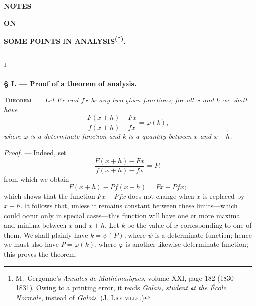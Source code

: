 
\providecommand{\GalSourcePageStart}[4]{}%
\providecommand{\GalSourcePageBoundary}[4]{\space}%
\providecommand{\GalSourceError}[2]{#1}%
\providecommand{\GalHistoricalFootnote}[1]{\footnote{#1}}%
\providecommand{\GalArticleEndRule}{\par\smallskip\begin{center}\rule{0.18\linewidth}{0.4pt}\end{center}}%

\GalSourcePageStart{038}{L0037}{9}{9}

\begin{center}
{\Large\bfseries NOTES\par}
\vspace{0.35em}
{\scriptsize\bfseries ON\par}
\vspace{0.35em}
{\large\bfseries SOME POINTS IN ANALYSIS\textsuperscript{(*)}.\par}
\vspace{0.75em}
\rule{0.12\linewidth}{0.4pt}
\end{center}

\GalHistoricalFootnote{M.~Gergonne's \emph{Annales de Mathématiques}, volume XXI,
page 182 (1830--1831). Owing to a printing error, it reads
\emph{Galais, student at the École Normale}, instead of \emph{Galois}.
\textsc{(J. Liouville.)}}

\begin{center}
\textbf{§ I. — Proof of a theorem of analysis.}
\end{center}

\noindent\textsc{Theorem.} — \emph{Let $Fx$ and $fx$ be any two given functions;
for all $x$ and $h$ we shall have}
\[
\frac{F(x+h)-Fx}{f(x+h)-fx}=\varphi(k),
\]
\emph{where $\varphi$ is a determinate function and $k$ is a quantity between
$x$ and $x+h$.}

\medskip
\noindent\emph{Proof.} — Indeed, set
\[
\frac{F(x+h)-Fx}{f(x+h)-fx}=P;
\]
from which we obtain
\[
F(x+h)-Pf(x+h)=Fx-Pfx;
\]
which shows that the function $Fx-Pfx$ does not change when $x$ is replaced by
$x+h$. It follows that, unless it remains constant between these limits---which
could occur only in special cases---this function will have one or more maxima
and minima between $x$ and $x+h$. Let $k$ be the
value of $x$ corresponding to one of them. We shall plainly have
$k=\psi(P)$, where $\psi$ is a determinate function; hence we must also have
$P=\varphi(k)$, where $\varphi$ is another likewise determinate function;
this proves the theorem.

